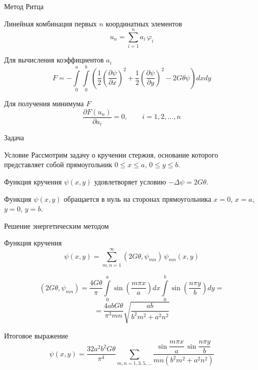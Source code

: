 \documentclass[ignoreonframetext,unicode]{beamer}
\begin{document}
\begin{frame}{Метод Ритца}
	\begin{block}{Линейная комбинация первых $n$ координатных элементов}	
	\[
	u_n = \sum_{i = 1}^n a_i \, \varphi_i
	\]
\end{block}
		
	\begin{block}{Для вычисления коэффициентов $a_i$}	
		\[
		F = - \int\limits_0^a \int\limits_0^b \left(
		\frac{1}{2}
		\left(\frac{\partial\psi}{\partial x}\right)^2 + 
		\frac{1}{2}
		\left(\frac{\partial\psi}{\partial y}\right)^2
		-2G\theta\psi
		\right) dx dy
		\]
	\end{block}

\begin{block}{Для получения минимума $F$}
	\[
		\frac{\partial F(u_n)}{\partial a_i} = 0, \qquad i = 1, 2, \ldots, n
	\]
\end{block}
	
\end{frame}	

\begin{frame}{Задача}
	
		\begin{block}{Условие}
		Рассмотрим задачу о кручении стержня, основание которого представляет собой   прямоугольник
		$0 \leqslant x \leqslant a$, $0 \leqslant y \leqslant b$.
	\end{block}
		\begin{block}{}
		Функция кручения $\psi(x, y)$ удовлетворяет условию $-\Delta \psi = 2 G \theta$.
	\end{block}
\begin{block}{}
		Функция $\psi(x, y)$ обращается в нуль на
		сторонах прямоугольника $x= 0$, $x = a$, $y = 0$, $y = b$.
		\end{block}
	
\end{frame}

\begin{frame}{Решение энергетическим методом}
	\begin{block}{Функция кручения}	
		\[
		\psi(x, y) = \sum_{m, n = 1}^\infty (2G \theta, \psi_{mn}) \, \psi_{mn}(x, y)
		\]
	\end{block}
		\begin{block}{}
	\[
	(2G \theta, \psi_{mn}) = \frac{4 G \theta}{\pi}\int\limits_0^a \sin\left(\frac{m \pi x}{a}\right) dx \int\limits_0^b
	\sin\left(\frac{n \pi y}{b}\right) dy = 
	\]
	\[
	= \frac{4abG\theta}{\pi^3 mn} \sqrt{\frac{ab}{b^2 m^2 + a^2 n^2}}
	\]
\end{block}
\begin{block}{Итоговое выражение}	
	\[
	\psi(x, y) = \frac{32 a^2 b^2 G\theta}{\pi^4} \!\!\! \sum_{m, n = 1, 3, 5, \ldots}
	\!\!\! \frac{\sin\dfrac{m\pi x}{a} \, \sin\dfrac{n\pi y}{b}}{mn(b^2 m^2 + a^2 n^2)}
	\]
\end{block}
\end{frame}
\end{document}
